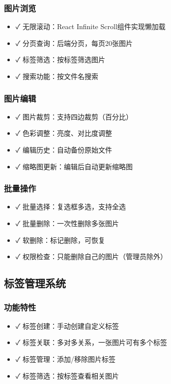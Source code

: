 \documentclass[12pt,a4paper]{article}
\newcommand{\feature}[1]{\textcolor{green!60!black}{✓ #1}}
\begin{document}
\subsubsection{图片浏览}
\begin{itemize}
    \item \feature{无限滚动}：React Infinite Scroll组件实现懒加载
    \item \feature{分页查询}：后端分页，每页20张图片
    \item \feature{标签筛选}：按标签筛选图片
    \item \feature{搜索功能}：按文件名搜索
\end{itemize}

\subsubsection{图片编辑}
\begin{itemize}
    \item \feature{图片裁剪}：支持四边裁剪（百分比）
    \item \feature{色彩调整}：亮度、对比度调整
    \item \feature{编辑历史}：自动备份原始文件
    \item \feature{缩略图更新}：编辑后自动更新缩略图
\end{itemize}

\subsubsection{批量操作}
\begin{itemize}
    \item \feature{批量选择}：复选框多选，支持全选
    \item \feature{批量删除}：一次性删除多张图片
    \item \feature{软删除}：标记删除，可恢复
    \item \feature{权限检查}：只能删除自己的图片（管理员除外）
\end{itemize}

\subsection{标签管理系统}

\subsubsection{功能特性}
\begin{itemize}
    \item \feature{标签创建}：手动创建自定义标签
    \item \feature{标签关联}：多对多关系，一张图片可有多个标签
    \item \feature{标签管理}：添加/移除图片标签
    \item \feature{标签筛选}：按标签查看相关图片
\end{itemize}
\end{document}
